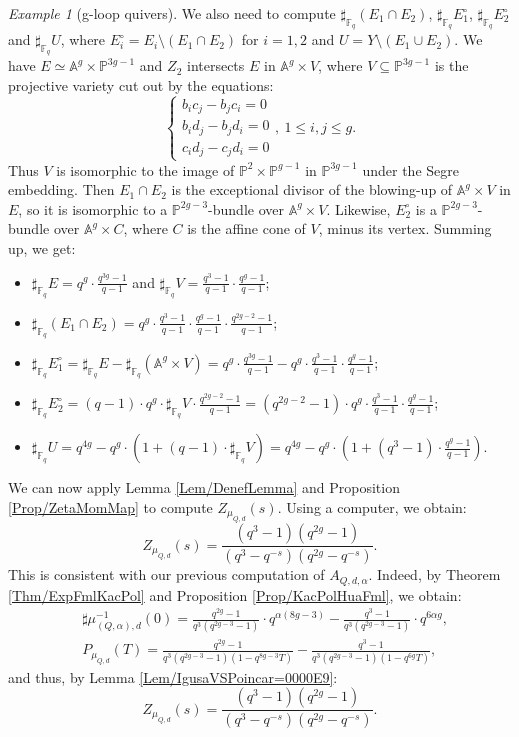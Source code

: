 \documentclass[11pt,english]{article}
\numberwithin{equation}{section}
\numberwithin{figure}{section}
\theoremstyle{definition}
\theoremstyle{plain}
\theoremstyle{remark}
\newtheorem{exmp}[df]{Example}
\newcommand\FF{\mathbb{F}}
\begin{document}
\begin{exmp}[g-loop quivers]
We also need to compute $\sharp_{\FF_{q}}(E_{1}\cap E_{2})$, $\sharp_{\FF_{q}}E_{1}^{\circ}$,
$\sharp_{\FF_{q}}E_{2}^{\circ}$ and $\sharp_{\FF_{q}}U$, where $E_{i}^{\circ}=E_{i}\setminus(E_{1}\cap E_{2})$
for $i=1,2$ and $U=Y\setminus(E_{1}\cup E_{2})$. We have $E\simeq\mathbb{A}^{g}\times\mathbb{P}^{3g-1}$
and $Z_{2}$ intersects $E$ in $\mathbb{A}^{g}\times V$, where $V\subseteq\mathbb{P}^{3g-1}$
is the projective variety cut out by the equations:\[
\left\{
\begin{array}{l}
b_ic_j-b_jc_i=0 \\
b_id_j-b_jd_i=0 \\
c_id_j-c_jd_i=0
\end{array}
\right.
,\ 1\leq i,j\leq g.
\] Thus $V$ is isomorphic to the image of $\mathbb{P}^{2}\times\mathbb{P}^{g-1}$
in $\mathbb{P}^{3g-1}$ under the Segre embedding. Then $E_{1}\cap E_{2}$
is the exceptional divisor of the blowing-up of $\mathbb{A}^{g}\times V$
in $E$, so it is isomorphic to a $\mathbb{P}^{2g-3}$-bundle over
$\mathbb{A}^{g}\times V$. Likewise, $E_{2}^{\circ}$ is a $\mathbb{P}^{2g-3}$-bundle
over $\mathbb{A}^{g}\times C$, where $C$ is the affine cone of $V$,
minus its vertex. Summing up, we get:
\begin{itemize}
\item $\sharp_{\FF_{q}}E=q^{g}\cdot\frac{q^{3g}-1}{q-1}$ and $\sharp_{\FF_{q}}V=\frac{q^{3}-1}{q-1}\cdot\frac{q^{g}-1}{q-1}$;
\item $\sharp_{\FF_{q}}(E_{1}\cap E_{2})=q^{g}\cdot\frac{q^{3}-1}{q-1}\cdot\frac{q^{g}-1}{q-1}\cdot\frac{q^{2g-2}-1}{q-1}$;
\item $\sharp_{\FF_{q}}E_{1}^{\circ}=\sharp_{\FF_{q}}E-\sharp_{\FF_{q}}(\mathbb{A}^{g}\times V)=q^{g}\cdot\frac{q^{3g}-1}{q-1}-q^{g}\cdot\frac{q^{3}-1}{q-1}\cdot\frac{q^{g}-1}{q-1}$;
\item $\sharp_{\FF_{q}}E_{2}^{\circ}=(q-1)\cdot q^{g}\cdot\sharp_{\FF_{q}}V\cdot\frac{q^{2g-2}-1}{q-1}=(q^{2g-2}-1)\cdot q^{g}\cdot\frac{q^{3}-1}{q-1}\cdot\frac{q^{g}-1}{q-1}$;
\item $\sharp_{\FF_{q}}U=q^{4g}-q^{g}\cdot(1+(q-1)\cdot\sharp_{\FF_{q}}V)=q^{4g}-q^{g}\cdot(1+(q^{3}-1)\cdot\frac{q^{g}-1}{q-1})$.
\end{itemize}
We can now apply Lemma \ref{Lem/DenefLemma} and Proposition \ref{Prop/ZetaMomMap}
to compute $Z_{\mu_{Q,d}}(s)$. Using a computer, we obtain:\[
Z_{\mu_{Q,d}}(s)
=
\frac{(q^3-1)(q^{2g}-1)}{(q^{3}-q^{-s})(q^{2g}-q^{-s})}.
\]This is consistent with our previous computation of $A_{Q,d,\alpha}$.
Indeed, by Theorem \ref{Thm/ExpFmlKacPol} and Proposition \ref{Prop/KacPolHuaFml},
we obtain:\begin{align*}
& \sharp \mu_{(Q,\alpha),d}^{-1}(0) = \frac{q^{2g}-1}{q^{3}(q^{2g-3}-1)}\cdot q^{\alpha(8g-3)}-\frac{q^{3}-1}{q^{3}(q^{2g-3}-1)}\cdot q^{6\alpha g}, \\
& P_{\mu_{Q,d}}(T) = \frac{q^{2g}-1}{q^{3}(q^{2g-3}-1)(1-q^{8g-3}T)}-\frac{q^{3}-1}{q^{3}(q^{2g-3}-1)(1-q^{6g}T)},
\end{align*}and thus, by Lemma \ref{Lem/IgusaVSPoincar=0000E9}:\[
Z_{\mu_{Q,d}}(s)
=
\frac{(q^3-1)(q^{2g}-1)}{(q^{3}-q^{-s})(q^{2g}-q^{-s})}.
\]


\end{exmp}
\end{document}
